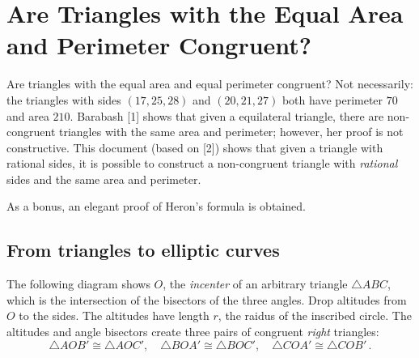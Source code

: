 
\chapter{Are Triangles with the Equal Area and Perimeter Congruent?}\label{c.congruent}

Are triangles with the equal area and equal perimeter congruent? Not necessarily: the triangles with sides $(17,25,28)$ and $(20,21,27)$ both have perimeter $70$ and area $210$. Barabash [1] shows that given a equilateral triangle, there are non-congruent triangles with the same area and perimeter; however, her proof is not constructive. This document (based on [2]) shows that given a triangle with rational sides, it is possible to construct a non-congruent triangle with \emph{rational} sides and the same area and perimeter.

As a bonus, an elegant proof of Heron's formula is obtained.

\vspace{-2ex}

\section{From triangles to elliptic curves}

The following diagram shows $O$, the \emph{incenter} of an arbitrary triangle $\triangle ABC$, which is the intersection of the bisectors of the three angles.  Drop altitudes from $O$ to the sides. The altitudes have length $r$, the raidus of the inscribed circle. The altitudes and angle bisectors create three pairs of congruent \emph{right} triangles:
\[
\triangle AOB'\cong \triangle AOC',\quad \triangle BOA'\cong \triangle BOC',\quad \triangle COA'\cong \triangle COB'\,.
\]

\vspace*{-6ex}

